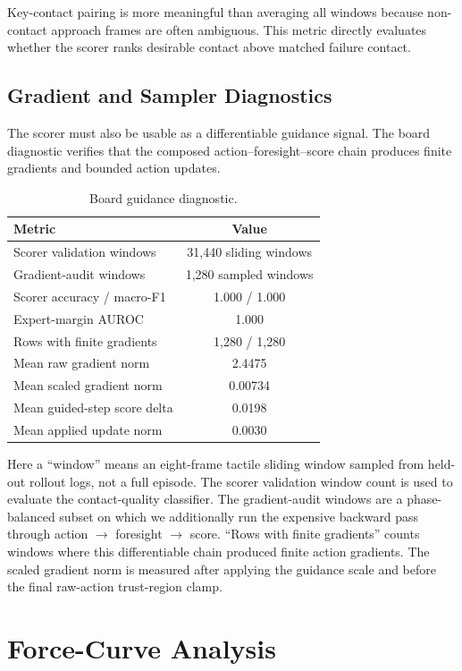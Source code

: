 \documentclass[10pt,letterpaper]{article}
\newcommand{\tabstyle}{\small\setlength{\tabcolsep}{3pt}\renewcommand{\arraystretch}{1.15}}
\begin{document}
Key-contact pairing is more meaningful than averaging all windows because
non-contact approach frames are often ambiguous. This metric directly evaluates
whether the scorer ranks desirable contact above matched failure contact.

\subsection{Gradient and Sampler Diagnostics}

The scorer must also be usable as a differentiable guidance signal. The board
diagnostic verifies that the composed action--foresight--score chain produces
finite gradients and bounded action updates.

\begin{table}[H]
\caption{Board guidance diagnostic.}
\label{tab:guidance_diag_appendix}
\centering
\tabstyle
\begin{tabular}{lc}
\toprule
Metric & Value\\
\midrule
Scorer validation windows & 31,440 sliding windows\\
Gradient-audit windows & 1,280 sampled windows\\
Scorer accuracy / macro-F1 & 1.000 / 1.000\\
Expert-margin AUROC & 1.000\\
Rows with finite gradients & 1,280 / 1,280\\
Mean raw gradient norm & 2.4475\\
Mean scaled gradient norm & 0.00734\\
Mean guided-step score delta & 0.0198\\
Mean applied update norm & 0.0030\\
\bottomrule
\end{tabular}
\end{table}

Here a ``window'' means an eight-frame tactile sliding window sampled from
held-out rollout logs, not a full episode. The scorer validation window count is
used to evaluate the contact-quality classifier. The gradient-audit windows are
a phase-balanced subset on which we additionally run the expensive backward pass
through action $\rightarrow$ foresight $\rightarrow$ score. ``Rows with finite
gradients'' counts windows where this differentiable chain produced finite
action gradients. The scaled gradient norm is measured after applying the
guidance scale and before the final raw-action trust-region clamp.

\section{Force-Curve Analysis}
\label{sec:force}
\end{document}
